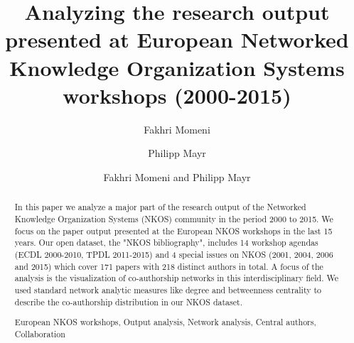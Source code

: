 \documentclass[runningheads,a4paper]{llncs}
\newcommand{\keywords}[1]{\par\addvspace\baselineskip
\noindent\keywordname\enspace\ignorespaces#1}
\begin{document}
\mainmatter  %

\title{Analyzing the research output presented at European Networked Knowledge Organization Systems workshops (2000-2015)}



%
%
\author{Fakhri Momeni%
	\and Philipp Mayr}
%

\author{Fakhri Momeni and Philipp Mayr}

%
%

\maketitle


\begin{abstract}		
In this paper we analyze a major part of the research output of the Networked Knowledge Organization Systems (NKOS) community in the period 2000 to 2015. We focus on the paper output presented at the European NKOS workshops in the last 15 years. Our open dataset, the "NKOS bibliography", includes 14 workshop agendas (ECDL 2000-2010, TPDL 2011-2015) and 4 special issues on NKOS (2001, 2004, 2006 and 2015) which cover 171 papers with 218 distinct authors in total. A focus of the analysis is the visualization of co-authorship networks in this interdisciplinary field. We used standard network analytic measures like degree and betweenness centrality to describe the co-authorship distribution in our NKOS dataset. %


 
\keywords{European NKOS workshops, Output analysis, Network analysis, Central authors, Collaboration}
\end{abstract}
\end{document}
